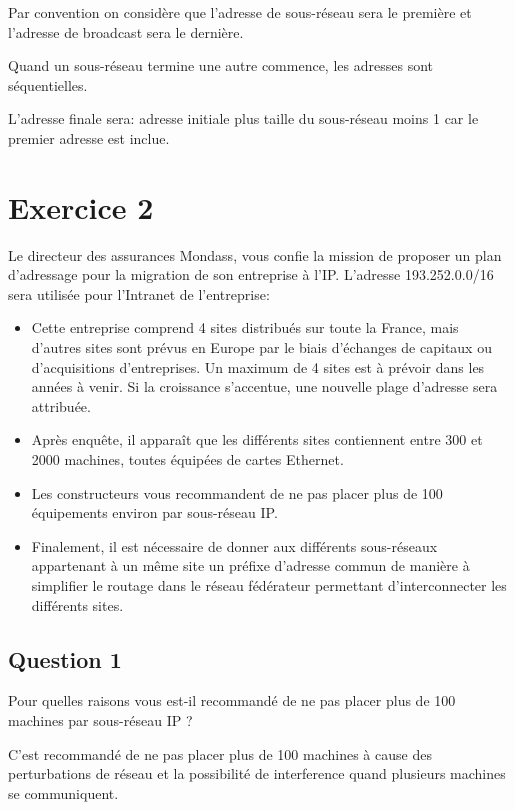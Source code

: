 \documentclass{article}
\begin{document}
\begin{resolution}
    \begin{remark}
        Par convention on considère que l'adresse de sous-réseau sera le première et l'adresse de broadcast sera le dernière. 
    \end{remark}
    \begin{remark}
        Quand un sous-réseau termine une autre commence, les adresses sont séquentielles. 
    \end{remark}
    \begin{remark}
        L'adresse finale sera: adresse initiale plus taille du sous-réseau moins 1 car le premier adresse est inclue.
    \end{remark}

\end{resolution}

\section*{Exercice 2}
Le directeur des assurances Mondass, vous confie la mission de proposer un plan d'adressage pour la migration de son entreprise à l'IP. L'adresse 193.252.0.0/16 sera utilisée pour l'Intranet de l'entreprise:
\begin{itemize}
    \item Cette entreprise comprend 4 sites distribués sur toute la France, mais d'autres sites sont prévus en Europe par le biais d'échanges de capitaux ou d'acquisitions d'entreprises.  Un maximum de 4 sites est à prévoir dans les années à venir. Si la croissance s'accentue, une nouvelle plage d'adresse sera attribuée.
    \item Après enquête, il apparaît que les différents sites contiennent entre 300 et 2000 machines, toutes équipées de cartes Ethernet.
    \item Les constructeurs vous recommandent de ne pas placer plus de 100 équipements environ par sous-réseau IP.
    \item Finalement, il est nécessaire de donner aux différents sous-réseaux appartenant à un même site un préfixe d'adresse commun de manière à simplifier le routage dans le réseau fédérateur permettant d'interconnecter les différents sites.
\end{itemize}
\subsection*{Question 1}
\begin{exercise}
    Pour quelles raisons vous est-il recommandé de ne pas placer plus de 100 machines par sous-réseau IP ?
\end{exercise}
\begin{resolution}
    C'est recommandé de ne pas placer plus de 100 machines à cause des perturbations de réseau et la possibilité de interference quand plusieurs machines se communiquent.
\end{resolution}
    
\end{document}
